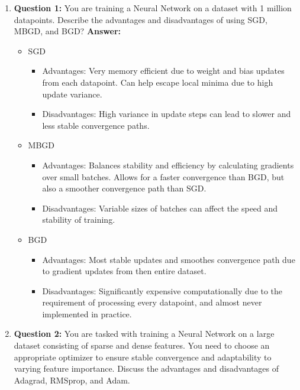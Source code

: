 \documentclass{article}
\begin{document}
\begin{enumerate}
    \item \textbf{Question 1:}
    \newline
    You are training a Neural Network on a dataset with 1 million datapoints. Describe the advantages and disadvantages of using SGD, MBGD, and BGD?
    \newline
    \textbf{Answer:}
    \begin{itemize}
        \item SGD
        \begin{itemize}
            \item Advantages: Very memory efficient due to weight and bias updates from each datapoint. Can help escape local minima due to high update variance.
            \item Disadvantages: High variance in update steps can lead to slower and less stable convergence paths.
        \end{itemize}
        \item MBGD
        \begin{itemize}
            \item Advantages: Balances stability and efficiency by calculating gradients over small batches. Allows for a faster convergence than BGD, but also a smoother convergence path than SGD.
            \item Disadvantages: Variable sizes of batches can affect the speed and stability of training.
        \end{itemize}
        \item BGD
        \begin{itemize}
            \item Advantages: Most stable updates and smoothes convergence path due to gradient updates from then entire dataset.
            \item Disadvantages: Significantly expensive computationally due to the requirement of processing every datapoint, and almost never implemented in practice.
        \end{itemize}
    \end{itemize}
    \item \textbf{Question 2:}
    \newline
    You are tasked with training a Neural Network on a large dataset consisting of sparse and dense features. You need to choose an appropriate optimizer to ensure stable convergence and adaptability to varying feature importance. Discuss the advantages and disadvantages of Adagrad, RMSprop, and Adam.

\end{enumerate}
\end{document}
